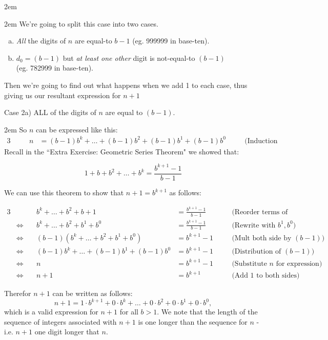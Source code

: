 \documentclass{article}
\newenvironment{jprIn}{\begin{adjustwidth}{2em}{}}{\end{adjustwidth}}
\begin{document}
\begin{jprIn}
\begin{jprIn}
We're going to split this case into two cases.

\begin{enumerate}[a)]
\item \emph{All} the digits of $n$ are equal-to $b{-}1$ (eg. 999999 in base-ten).
\item $d_0=(b-1)$ but \emph{at least one other} digit is not-equal-to $(b-1)$\\
(eg. 782999 in base-ten).
\end{enumerate}

Then we're going to find out what happens when we add 1 to each case, thus giving us our
resultant expression for $n+1$

\break
Case 2a) ALL of the digits of $n$ are equal to $(b-1)$.
\begin{jprIn}
So $n$ can be expressed like this:
\begin{alignat*}{3}
  &\quad&n
  &= (b{-}1)b^k+\dots{}+(b{-}1)b^2+(b{-}1)b^1+(b{-}1)b^0 &&\quad\text{(Induction Assumption)}
\end{alignat*}
Recall in the ``Extra Exercise: Geometric Series Theorem"
we showed that:

\[1+b+b^2+\dots{}+b^k=\frac{b^{k+1}-1}{b-1}\]

We can use this theorem to show that $n+1=b^{k+1}$ as follows:
\smallskip
\begin{small}
\begin{alignat*}{3}
  &&b^k+\dots{}+b^2+b+1
  &= \frac{b^{k+1}-1}{b-1} &&\quad\text{(Reorder terms of G.S.Thm.)}\\
  &\Leftrightarrow\quad
  &b^k+\dots{}+b^2+b^1+b^0
  &= \frac{b^{k+1}-1}{b-1} &&\quad\text{(Rewrite with }b^1, b^0\text{)}\\
  &\Leftrightarrow\quad
  &(b-1)(b^k+\dots{}+b^2+b^1+b^0)
  &= b^{k+1}-1 &&\quad\text{(Mult both side by }(b{-}1)\text{)}\\
  &\Leftrightarrow\quad
  &(b{-}1)b^k+\dots{}+(b{-}1)b^1+(b{-}1)b^0
  &= b^{k+1}-1 &&\quad\text{(Distribution of }(b{-}1)\text{)}\\
  &\Leftrightarrow\quad
  &n
  &= b^{k+1}-1 &&\quad\text{(Substitute }n\text{ for expression)}\\
  &\Leftrightarrow\quad
  &n+1
  &= b^{k+1} &&\quad\text{(Add 1 to both sides)}
\end{alignat*}
\end{small}
\smallskip
Therefor $n+1$ can be written as follows:
\[n+1= 1\cdot{}b^{k+1}+0\cdot{}b^{k}+\dots{}+0\cdot{}b^2+0\cdot{}b^1+0\cdot{}b^0,\]
which is a valid expression for $n+1$ for all $b>1$. We note that the length of the sequence of
integers associated with $n+1$ is one longer than the sequence for $n$ - i.e. $n+1$ one digit longer that $n$.


\end{jprIn}
\end{jprIn}
\end{jprIn}
\end{document}
